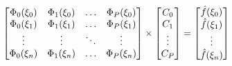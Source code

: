 \documentclass[12pt]{article}
\begin{document}
  \begin{equation}
 \label{eq:PCEsystem}
 \begin{bmatrix} 
 \Phi_{0}(\xi_{0}) &  \Phi_{1}(\xi_{0}) & \dots &  \Phi_{P}(\xi_{0}) \\
 \Phi_{0}(\xi_{1}) &  \Phi_{1}(\xi_{1}) & \dots &  \Phi_{P}(\xi_{1}) \\
 \vdots & \vdots & \ddots & \vdots \\
 \Phi_{0}(\xi_{n}) &  \Phi_{1}(\xi_{n}) & \dots &  \Phi_{P}(\xi_{n}) \\
 \end{bmatrix}
 \times
 \begin{bmatrix}
 C_{0} \\
 C_{1} \\
 \vdots \\
 C_{P} \\
 \end{bmatrix}
 =
 \begin{bmatrix}
 \hat f(\xi_{0}) \\
 \hat f(\xi_{1}) \\
 \vdots \\
 \hat f(\xi_{n}) \\
 \end{bmatrix} \\
 \end{equation}
 
 


\end{document}
